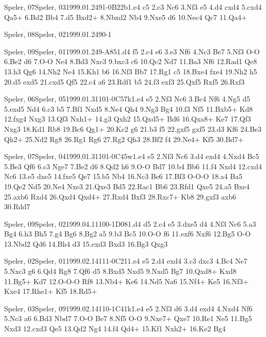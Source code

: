\documentclass[twocolumn,a4paper,10pt]{report}
\begin{document}
\begin{chessgame}{Speler, 07}{Speler, 03}{1999.01.24}{9}{1-0}{B22b}{1.e4 c5 2.c3 Nc6 3.Nf3 e5 4.d4 cxd4 5.cxd4 Qa5+ 6.Bd2 Bb4 7.d5 Bxd2+ 8.Nbxd2 Nb4 9.Nxe5 d6 10.Nec4 Qc7 11.Qa4+}\end{chessgame}
\begin{chessempty}{Speler, 08}{Speler, 02}{1999.01.24}{9}{0-1}{}\end{chessempty}
\begin{chessgame}{Speler, 09}{Speler, 01}{1999.01.24}{9}{\textonehalf-\textonehalf}{A85}{1.d4 f5 2.c4 e6 3.e3 Nf6 4.Nc3 Be7 5.Nf3 O-O 6.Be2 d6 7.O-O Ne4 8.Bd3 Nxc3 9.bxc3 c6 10.Qc2 Nd7 11.Ba3 Nf6 12.Rad1 Qe8 13.h3 Qg6 14.Nh2 Ne4 15.Kh1 b6 16.Nf3 Bb7 17.Rg1 c5 18.Bxe4 fxe4 19.Nh2 h5 20.d5 exd5 21.cxd5 Qf5 22.c4 a6 23.Rdf1 b5 24.f3 exf3 25.Qxf5 Rxf5 26.Rxf3}\end{chessgame}
\begin{chessgame}{Speler, 06}{Speler, 05}{1999.01.31}{10}{1-0}{C57k}{1.e4 e5 2.Nf3 Nc6 3.Bc4 Nf6 4.Ng5 d5 5.exd5 Nd4 6.c3 b5 7.Bf1 Nxd5 8.Ne4 Qh4 9.Ng3 Bg4 10.f3 Nf5 11.Bxb5+ Kd8 12.fxg4 Nxg3 13.Qf3 Nxh1+ 14.g3 Qxh2 15.Qxd5+ Bd6 16.Qxa8+ Ke7 17.Qf3 Nxg3 18.Kd1 Rb8 19.Bc6 Qg1+ 20.Kc2 g6 21.b3 f5 22.gxf5 gxf5 23.d3 Kf6 24.Be3 Qh2+ 25.Nd2 Rg8 26.Rg1 Rg6 27.Rg2 Qh3 28.Bf2 f4 29.Ne4+ Kf5 30.Bd7+}\end{chessgame}
\begin{chessgame}{Speler, 07}{Speler, 04}{1999.01.31}{10}{1-0}{C45w}{1.e4 e5 2.Nf3 Nc6 3.d4 exd4 4.Nxd4 Bc5 5.Be3 Qf6 6.c3 Nge7 7.Be2 d6 8.Qd2 h6 9.O-O Bd7 10.b4 Bb6 11.f4 Nxd4 12.cxd4 Nc6 13.e5 dxe5 14.fxe5 Qe7 15.b5 Nb4 16.Nc3 Be6 17.Bf3 O-O-O 18.a4 Ba5 19.Qe2 Nd5 20.Ne4 Nxe3 21.Qxe3 Bd5 22.Rac1 Bb6 23.Rfd1 Qxe5 24.a5 Bxe4 25.axb6 Rxd4 26.Qxd4 Qxd4+ 27.Rxd4 Bxf3 28.Rxc7+ Kb8 29.gxf3 axb6 30.Rdd7}\end{chessgame}
\begin{chessgame}{Speler, 09}{Speler, 02}{1999.04.11}{10}{0-1}{D08}{1.d4 d5 2.c4 e5 3.dxe5 d4 4.Nf3 Nc6 5.a3 Bg4 6.h3 Bh5 7.g4 Bg6 8.Bg2 a5 9.b3 Bc5 10.O-O f6 11.exf6 Nxf6 12.Bg5 O-O 13.Nbd2 Qd6 14.Bh4 d3 15.exd3 Bxd3 16.Bg3 Qxg3}\end{chessgame}
\begin{chessgame}{Speler, 02}{Speler, 01}{1999.02.14}{11}{1-0}{C21}{1.e4 e5 2.d4 exd4 3.c3 dxc3 4.Bc4 Ne7 5.Nxc3 g6 6.Qd4 Rg8 7.Qf6 d5 8.Bxd5 Nxd5 9.Nxd5 Bg7 10.Qxd8+ Kxd8 11.Bg5+ Kd7 12.O-O-O Rf8 13.Nb4+ Ke6 14.Nd5 Na6 15.Nf4+ Ke5 16.Nf3+ Kxe4 17.Rhe1+ Kf5 18.Rd5+}\end{chessgame}
\begin{chessgame}{Speler, 03}{Speler, 09}{1999.02.14}{11}{0-1}{C41k}{1.e4 e5 2.Nf3 d6 3.d4 exd4 4.Nxd4 Nf6 5.Nc3 a6 6.Bd3 Nbd7 7.O-O Be7 8.Nf5 O-O 9.Nxe7+ Qxe7 10.Re1 Ne5 11.Bg5 Nxd3 12.cxd3 Qe5 13.Qd2 Ng4 14.f4 Qd4+ 15.Kf1 Nxh2+ 16.Ke2 Bg4\mate}\end{chessgame}
\end{document}

